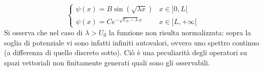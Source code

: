 \documentclass[10pt, oneside]{book}
\theoremstyle{plain}
\begin{document}
\[\begin{cases}
    \psi(x) = B \sin(\sqrt{\lambda x}) & x \in ]0,L[\\
    \psi(x) = C e^{- \sqrt{U_0 - \lambda} x} & x \in[L, +\infty[
\end{cases}\]
Si osserva che nel caso di $\lambda > U_0$ la funzione non risulta normalizzata: sopra la soglia di potenziale vi sono infatti infiniti autovalori, ovvero uno spettro continuo (a differenza di quello discreto sotto). Ciò è una peculiarità degli operatori su spazi vettoriali non finitamente generati quali sono gli osservabili.
\end{document}
